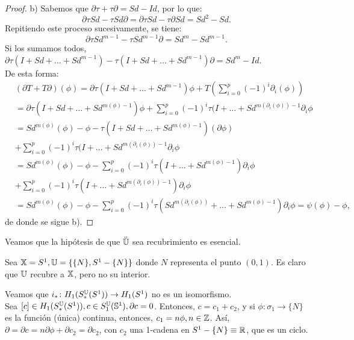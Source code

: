 \begin{proof}
  b) Sabemos que $\partial \tau + \tau \partial = Sd - Id$, por lo que:
  \[ \partial \tau Sd - \tau Sd \partial = \partial \tau Sd - \tau \partial Sd = Sd^2 - Sd. \]
  Repitiendo este proceso sucesivamente, se tiene:
  \[ \partial \tau Sd^{m - 1} - \tau Sd^{m-1} \partial = Sd^m - Sd^{m-1}. \]
  Si los sumamos todos, $\partial \tau(I + Sd + \dots + Sd^{m-1}) - \tau(I + Sd + \dots + Sd^{m-1}) \partial = Sd^m - Id$. \\
  De esta forma:
  \begin{align*}
    &(\partial T + T \partial)(\phi) = \partial \tau(I + Sd + \dots + Sd^{m-1}) \phi + T(\sum\limits_{i = 0}^p (-1)^i \partial_i(\phi)) \\
    &= \partial \tau(I + Sd + \dots + Sd^{m(\phi)-1}) \phi + \sum\limits_{i = 0}^p (-1)^i \tau(I + \dots + Sd^{m(\partial_i(\phi)) - 1} \partial_i \phi \\
    &= Sd^{m(\phi)}(\phi) - \phi - \tau(I + Sd + \dots + Sd^{m(\phi)-1})(\partial \phi)  \\
    &+ \sum\limits_{i = 0}^p (-1)^i \tau(I + \dots + Sd^{m(\partial_i(\phi)) - 1} \partial_i \phi \\
    &= Sd^{m(\phi)}(\phi) - \phi - \sum\limits_{i = 0}^p (-1)^i \tau(I + \dots + Sd^{m(\phi) - 1}) \partial_i \phi \\
    &+ \sum\limits_{i = 0}^p (-1)^i \tau(I + \dots + Sd^{m(\partial_i(\phi)) - 1}) \partial_i \phi \\
    &= Sd^{m(\phi)}(\phi) - \phi - \sum\limits_{i = 0}^p (-1)^i \tau(Sd^{m(\partial_i(\phi))} + \dots + Sd^{m(\phi) - 1}) \partial_i \phi = \psi(\phi) - \phi,
  \end{align*}
  de donde se sigue b).
\end{proof}

Veamos que la hipótesis de que $\interior{\U}$ sea recubrimiento es esencial.

Sea ${\mathbb X} = S^1, {\mathbb U} = \{\{N\}, S^1 - \{N\}\}$ donde $N$ representa el punto $(0, 1)$. Es claro que ${\mathbb U}$ recubre a ${\mathbb X}$, pero no su interior.

Veamos que $i_* \colon H_1(S_*^{\mathbb U}(S^1)) \to H_1(S^1)$ no es un isomorfismo. \\
Sea $[c] \in H_1(S_*^{\mathbb U}(S^1)), c \in S_1^{\mathbb U}({\mathbb S}^1), \partial c = 0$. Entonces, $c = c_1 + c_2$, y si $\phi \colon \sigma_1 \to \{N\}$ es la función
(única) continua, entonces, $c_1 = n\phi, n \in \mathbb{Z}$. Así, $\partial = \partial c = n \partial \phi + \partial c_2 = \partial c_2$, con $c_2$ una
1-cadena en $S^1 - \{N\} \equiv \mathbb{R}$, que es un ciclo.

